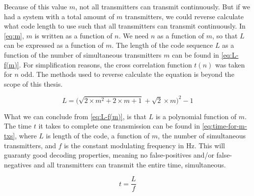 Because of this value $m$, not all transmitters can transmit continuously.
But if we had a system with a total amount of $m$ transmitters, we could reverse calculate what code length to use such that all transmitters can transmit continuously.
In \autoref{eq:m}, $m$ is written as a function of $n$.
We need $n$ as a function of $m$, so that $L$ can be expressed as a function of $m$.
The length of the code sequence $L$ as a function of the number of simultaneous transmitters $m$ can be found in \autoref{eq:L-f(m)}.
For simplification reasons, the cross correlation function $t(n)$ was taken for $n$ odd. 
The methods used to reverse calculate the equation is beyond the scope of this thesis.


\begin{equation}
	\label{eq:L-f(m)}
	L = \Bigg(\sqrt{2 \times m^2 + 2 \times m + 1} + \sqrt{2} \times m \Bigg)^2 - 1
\end{equation} 


What we can conclude from \autoref{eq:L-f(m)}, is that $L$ is a polynomial function of $m$.
The time $t$ it takes to complete one transmission can be found in \autoref{eq:time-for-m-txs}, where $L$ is length of the code, a function of $m$, the number of simultaneous transmitters, and $f$ is the constant modulating frequency in Hz.
This will guaranty good decoding properties, meaning no false-positives and/or false-negatives and all transmitters can transmit the entire time, simultaneous.

\begin{equation}
	\label{eq:time-for-m-txs}
	t = \frac{L}{f}
\end{equation}


